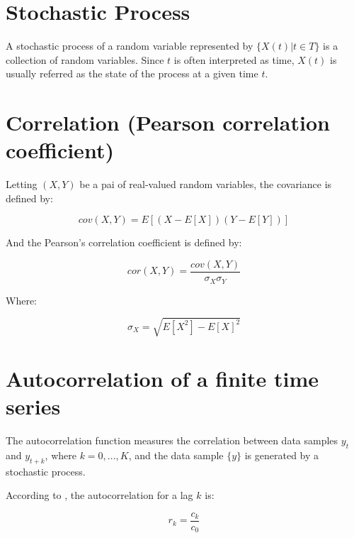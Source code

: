 \section{Stochastic Process}

A stochastic process of a random variable represented by $\{X(t)| t \in T\}$ is a collection of random variables. Since $t$ is often interpreted as time, $X (t) $ is usually referred as the state of the process at a given time $t$\cite{ross-probability}.

\section{Correlation (Pearson correlation coefficient)}

Letting $(X,Y)$ be a pai of real-valued random variables, the covariance is defined by:

\begin{equation}
cov(X, Y) = E[(X-E[X])(Y - E[Y])]
\end{equation}

And the Pearson's correlation coefficient is defined by:

\begin{equation}
cor(X, Y) = \frac{cov(X, Y)}{\sigma_X \sigma_Y}
\end{equation}

Where:

\begin{equation}
\sigma_X = \sqrt{  E[X^2] - E[X]^{2} } 
\end{equation}


\section{Autocorrelation of a finite time series}
The autocorrelation function measures the correlation between data samples $y_{t}$ and $y_{t + k}$, where $k =0, ..., K$, and the data sample $\{y\}$  is generated by a stochastic process.

According to \cite{book-time-series-analysis}, the autocorrelation for a lag $k$ is:

\begin{equation}
r_{k} = \frac{c_{k}}{c_{0}}
\end{equation}

